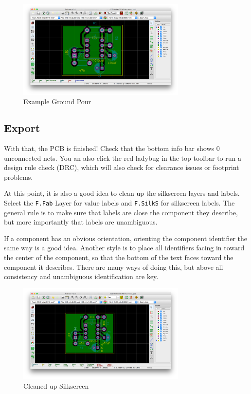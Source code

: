 \documentclass[12pt, oneside]{article}
\begin{document}
\begin{figure}[H]
\includegraphics[width=0.75\textwidth]{FinishPour}
\centering
\caption{Example Ground Pour}
\end{figure}

\subsection{Export}
With that, the PCB is finished! Check that the bottom info bar shows 0 unconnected nets. You an also click the red ladybug in the top toolbar to run a design rule check (DRC), which will also check for clearance issues or footprint problems. 

At this point, it is also a good idea to clean up the silkscreen layers and labels. Select the \texttt{F.Fab} Layer for value labels and \texttt{F.SilkS} for silkscreen labels. The general rule is to make sure that labels are close the component they describe, but more importantly that labels are unambiguous. 

If a component has an obvious orientation, orienting the component identifier the same way is a good idea. Another style is to place all identifiers facing in toward the center of the component, so that the bottom of the text faces toward the component it describes. There are many ways of doing this, but above all consistency and unambiguous identification are key.

\begin{figure}[H]
\includegraphics[width=0.75\textwidth]{SilkScreen}
\centering
\caption{Cleaned up Silkscreen}
\end{figure}
\end{document}
